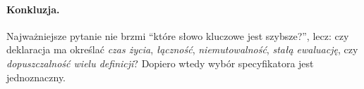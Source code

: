 \paragraph{Konkluzja.}
Najważniejsze pytanie nie brzmi ``które słowo kluczowe jest szybsze?'',
lecz: czy deklaracja ma określać \emph{czas życia}, \emph{łączność},
\emph{niemutowalność}, \emph{stałą ewaluację}, czy
\emph{dopuszczalność wielu definicji}? Dopiero wtedy wybór
specyfikatora jest jednoznaczny.
